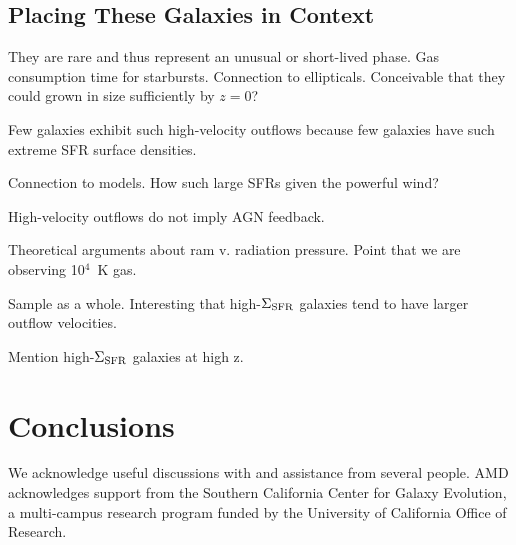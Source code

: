 \documentclass[apj]{emulateapj}
\newcommand{\sigmasfr}{\Sigma_{\textnormal{\scriptsize{SFR}}}}
\begin{document}
\subsection{Placing These Galaxies in Context}

They are rare and thus represent an unusual or short-lived phase.  Gas
consumption time for starbursts.  Connection to ellipticals.
Conceivable that they could grown in size sufficiently by $z=0$?

Few galaxies exhibit such high-velocity outflows because few galaxies
have such extreme SFR surface densities.

Connection to models.  How such large SFRs given the powerful wind?  

High-velocity outflows do not imply AGN feedback.

Theoretical arguments about ram v. radiation pressure.  Point that we
are observing 10$^4$~K gas.

Sample as a whole. Interesting that high-$\sigmasfr$ galaxies tend to
have larger outflow velocities.

Mention high-$\sigmasfr$ galaxies at high z.


\section{Conclusions}

\acknowledgments

We acknowledge useful discussions with and assistance from several
people.  AMD acknowledges support from the Southern California Center
for Galaxy Evolution, a multi-campus research program funded by the
University of California Office of Research.



\end{document}
